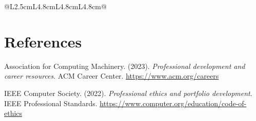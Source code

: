 \documentclass[12pt,stu]{apa7}
\begin{document}
\begin{longtable}{@{}L{2.5cm}L{4.8cm}L{4.8cm}L{4.8cm}@{}}
\bottomrule
\end{longtable}
\endgroup

\newpage

\section*{References}

Association for Computing Machinery. (2023). \textit{Professional development and career resources}. ACM Career Center. \url{https://www.acm.org/careers}

IEEE Computer Society. (2022). \textit{Professional ethics and portfolio development}. IEEE Professional Standards. \url{https://www.computer.org/education/code-of-ethics}
\end{document}
